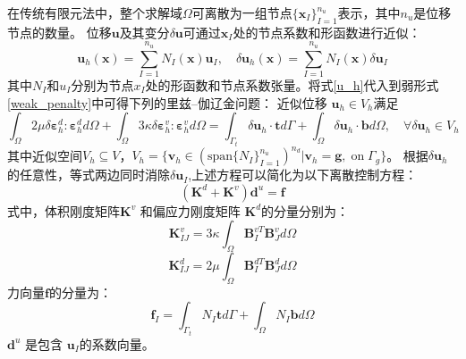 在传统有限元法中，整个求解域$\Omega$可离散为一组节点$\{\boldsymbol x_I\}_{I=1}^{n_u}$表示\cite{hughes2000}，其中$n_u$是位移节点的数量。
位移$\boldsymbol u$及其变分$\delta \boldsymbol u $可通过$\boldsymbol x_I$处的节点系数和形函数进行近似：
\begin{equation}\label{u_h}
    \boldsymbol u_h(\boldsymbol x) = \sum_{I=1}^{n_u} N_I(\boldsymbol x) \boldsymbol u_I, \quad
    \delta \boldsymbol u_h(\boldsymbol x) = \sum_{I=1}^{n_u} N_I(\boldsymbol x) \delta \boldsymbol u_I
\end{equation}
其中$N_I$和$u_I$分别为节点$x_I$处的形函数和节点系数张量。将式\eqref{u_h}代入到弱形式\eqref{weak_penalty}中可得下列的里兹--伽辽金问题：
近似位移 $\boldsymbol u_h \in V_h$满足
\begin{equation}\label{ritz_penalty}
\int_\Omega 2\mu \delta \boldsymbol \varepsilon^d_h : \boldsymbol \varepsilon^d_h d\Omega +
\int_\Omega 3\kappa \delta \boldsymbol \varepsilon^v_h : \boldsymbol \varepsilon^v_h d\Omega =
\int_{\Gamma_t} \delta \boldsymbol u_h \cdot \boldsymbol t d\Gamma + \int_\Omega \delta \boldsymbol u_h \cdot \boldsymbol b d\Omega, \quad
\forall \delta \boldsymbol u_h \in V_h
\end{equation}
其中近似空间$V_h \subseteq V$，$V_h = \{\boldsymbol v_h \in (\mathrm{span}\{N_I\}_{I=1}^{n_u})^{n_d} \vert \boldsymbol v_h = \boldsymbol g,\; \mathrm{on} \; \Gamma_g\}$。
根据$\delta \boldsymbol u_h$的任意性，等式两边同时消除$\delta \boldsymbol u_I$,上述方程可以简化为以下离散控制方程：
\begin{equation}\label{equilibrium_penalty}
    (\boldsymbol K^d +\boldsymbol K^v) \boldsymbol d^u = \boldsymbol f
\end{equation}
式中，体积刚度矩阵$\boldsymbol K^v$ 和偏应力刚度矩阵 $\boldsymbol K^d$的分量分别为：
\begin{equation}\label{stiffness_vol}
    \boldsymbol K^v_{IJ}=  3\kappa\int_{\Omega} \boldsymbol B^{vT}_I \boldsymbol B^v_J d\Omega
\end{equation}
\begin{equation}\label{stiffness_dev}
    \boldsymbol K^d_{IJ}= 2\mu\int_{\Omega} \boldsymbol B^{dT}_I \boldsymbol B^d_J d\Omega
\end{equation}
力向量$\boldsymbol f$的分量为：
\begin{equation}
    \boldsymbol f_I = \int_{\Gamma_t} N_I \boldsymbol t d\Gamma + \int_{\Omega} N_I \boldsymbol b d\Omega
\end{equation}
$\boldsymbol d^u$ 是包含 $\boldsymbol u_I$的系数向量。

